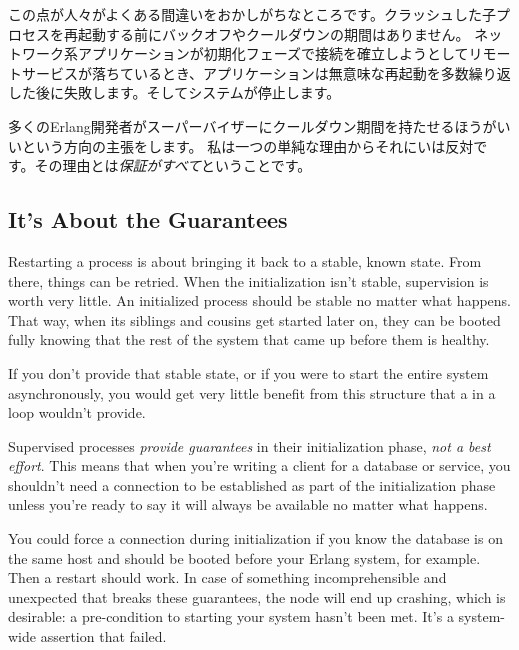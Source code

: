 この点が人々がよくある間違いをおかしがちなところです。クラッシュした子プロセスを再起動する前にバックオフやクールダウンの期間はありません。
ネットワーク系アプリケーションが初期化フェーズで接続を確立しようとしてリモートサービスが落ちているとき、アプリケーションは無意味な再起動を多数繰り返した後に失敗します。そしてシステムが停止します。

多くのErlang開発者がスーパーバイザーにクールダウン期間を持たせるほうがいいという方向の主張をします。
私は一つの単純な理由からそれにいは反対です。その理由とは\emph{保証がすべて}ということです。

\subsection{It's About the Guarantees}
\label{subsec:start-link-guarantees}

Restarting a process is about bringing it back to a stable, known state. From there, things can be retried. When the initialization isn't stable, supervision is worth very little. An initialized process should be stable no matter what happens. That way, when its siblings and cousins get started later on, they can be booted fully knowing that the rest of the system that came up before them is healthy.

If you don't provide that stable state, or if you were to start the entire system asynchronously, you would get very little benefit from this structure that a  in a loop wouldn't provide.

Supervised processes \emph{provide guarantees} in their initialization phase, \emph{not a best effort}. This means that when you're writing a client for a database or service, you shouldn't need a connection to be established as part of the initialization phase unless you're ready to say it will always be available no matter what happens.

You could force a connection during initialization if you know the database is on the same host and should be booted before your Erlang system, for example. Then a restart should work. In case of something incomprehensible and unexpected that breaks these guarantees, the node will end up crashing, which is desirable: a pre-condition to starting your system hasn't been met. It's a system-wide assertion that failed.

